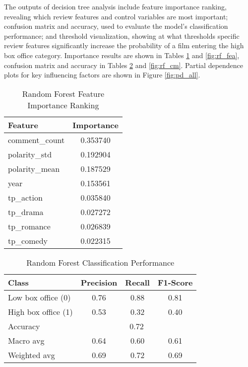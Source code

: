 \documentclass{article}
\begin{document}
The outputs of decision tree analysis include feature importance ranking, revealing which review features and control variables are most important; confusion matrix and accuracy, used to evaluate the model's classification performance; and threshold visualization, showing at what thresholds specific review features significantly increase the probability of a film entering the high box office category. Importance results are shown in Tables \ref{tab:rf_res} and \ref{fig:rf_fea}, confusion matrix and accuracy in Tables \ref{tab:rf_cm} and \ref{fig:rf_cm}. Partial dependence plots for key influencing factors are shown in Figure \ref{fig:pd_all}.

\begin{table}[htbp]
\centering
\caption{Random Forest Feature Importance Ranking}
\label{tab:rf_res}
\begin{tabular}{lc}
\toprule
\textbf{Feature} & \textbf{Importance} \\
\midrule
comment\_count & 0.353740 \\
polarity\_std & 0.192904 \\
polarity\_mean & 0.187529 \\
year & 0.153561 \\
tp\_action & 0.035840 \\
tp\_drama & 0.027272 \\
tp\_romance & 0.026839 \\
tp\_comedy & 0.022315 \\
\bottomrule
\end{tabular}
\end{table}

\begin{table}[htbp]
\centering
\caption{Random Forest Classification Performance}
\label{tab:rf_cm}
\begin{tabular}{lccc}
\toprule
\textbf{Class} & \textbf{Precision} & \textbf{Recall} & \textbf{F1-Score} \\
\midrule
Low box office (0) & 0.76 & 0.88 & 0.81 \\
High box office (1) & 0.53 & 0.32 & 0.40 \\
\midrule
Accuracy & \multicolumn{3}{c}{0.72} \\
Macro avg & 0.64 & 0.60 & 0.61 \\
Weighted avg & 0.69 & 0.72 & 0.69 \\
\bottomrule
\end{tabular}
\end{table}
\end{document}
